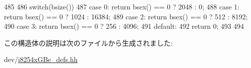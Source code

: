 \begin{DoxyCode}
485         {
486             switch(bsize()) {
487                 case 0: return bsex() == 0 ? 2048 : 0;
488                 case 1: return bsex() == 0 ? 1024 : 16384;
489                 case 2: return bsex() == 0 ? 512 : 8192;
490                 case 3: return bsex() == 0 ? 256 : 4096;
491                 default:
492                         return 0;
493             }
494         }
\end{DoxyCode}


この構造体の説明は次のファイルから生成されました:\begin{DoxyCompactItemize}
\item 
dev/\hyperlink{i8254xGBe__defs_8hh}{i8254xGBe\_\-defs.hh}\end{DoxyCompactItemize}

